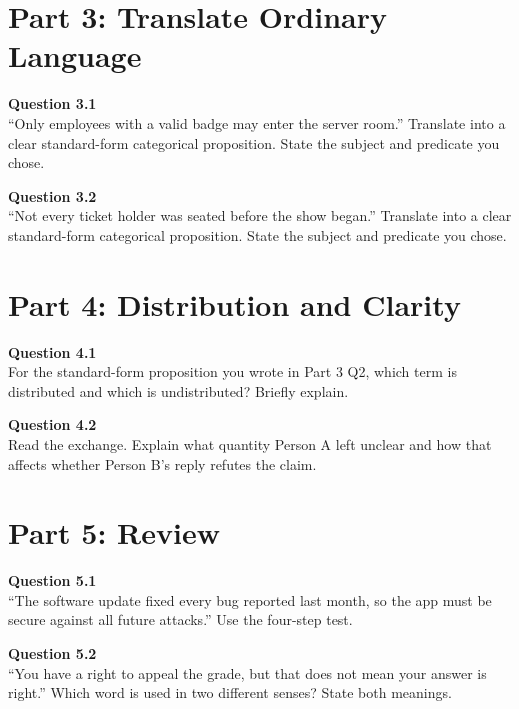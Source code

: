 \documentclass[12pt]{article}
\begin{document}
\section*{Part 3: Translate Ordinary Language}

\textbf{Question 3.1}\\[-0.15em]
``Only employees with a valid badge may enter the server room.'' Translate into a clear standard-form categorical proposition. State the subject and predicate you chose.


\textbf{Question 3.2}\\[-0.15em]
``Not every ticket holder was seated before the show began.'' Translate into a clear standard-form categorical proposition. State the subject and predicate you chose.


\newpage

\section*{Part 4: Distribution and Clarity}

\textbf{Question 4.1}\\[-0.15em]
For the standard-form proposition you wrote in Part 3 Q2, which term is distributed and which is undistributed? Briefly explain.


\textbf{Question 4.2}\\[-0.15em]
Read the exchange. Explain what quantity Person A left unclear and how that affects whether Person B's reply refutes the claim.

\vspace{0.2em}

\noindent{}


\newpage

\section*{Part 5: Review}

\textbf{Question 5.1}\\[-0.15em]
``The software update fixed every bug reported last month, so the app must be secure against all future attacks.'' Use the four-step test.


\textbf{Question 5.2}\\[-0.15em]
``You have a right to appeal the grade, but that does not mean your answer is right.'' Which word is used in two different senses? State both meanings.

\end{document}
